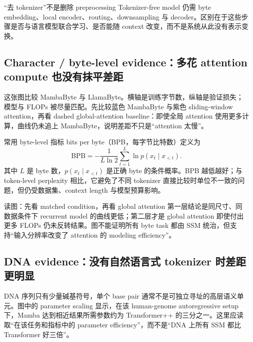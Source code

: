 
\begin{warningbox}{“去 tokenizer”不是删除 preprocessing}
Tokenizer-free model 仍需 byte embedding、local encoder、routing、downsampling 与 decoder。区别在于这些步骤是否与语言模型联合学习、是否能随 context 改变，而不是系统从此没有表示变换。
\end{warningbox}

\subsection{Character / byte-level evidence：多花 attention compute 也没有抹平差距}

这张图比较 MambaByte 与 LlamaByte。横轴是训练字节数，纵轴是验证损失；模型与 FLOPs 被尽量匹配。先比较蓝色 MambaByte 与紫色 sliding-window attention，再看 dashed global-attention baseline：即使全局 attention 使用更多计算，曲线仍未追上 MambaByte，说明差距不只是“attention 太慢”。


常用 byte-level 指标 bits per byte（BPB，每字节比特数）定义为
\[
\mathrm{BPB}=-\frac{1}{L\ln 2}\sum_{t=1}^{L}\ln p(x_t\mid x_{<t}).
\]
其中 $L$ 是 byte 数，$p(x_t\mid x_{<t})$ 是正确 byte 的条件概率。BPB 越低越好；与 token-level perplexity 相比，它避免了不同 tokenizer 直接比较时单位不一致的问题，但仍受数据集、context length 与模型预算影响。

\begin{knowledgebox}{读图：先看 matched condition，再看 global attention}
第一层结论是同尺寸、同数据条件下 recurrent model 的曲线更低；第二层才是 global attention 即使付出更多 FLOPs 仍未反转结果。图不能证明所有 byte task 都由 SSM 统治，但支持“输入分辨率改变了 attention 的 modeling efficiency”。
\end{knowledgebox}

\subsection{DNA evidence：没有自然语言式 tokenizer 时差距更明显}

DNA 序列只有少量碱基符号，单个 base pair 通常不是可独立寻址的高层语义单元。图中的 parameter scaling 显示，在该 human-genome autoregressive setup 下，Mamba 达到相近结果所需参数约为 Transformer++ 的三分之一。这里应读取“在该任务和指标中的 parameter efficiency”，而不是“DNA 上所有 SSM 都比 Transformer 好三倍”。

